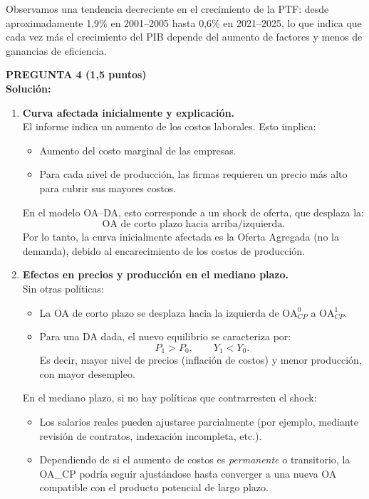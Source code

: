 \documentclass[11pt,addpoints]{article}
\begin{document}
Observamos una tendencia decreciente en el crecimiento de la PTF: desde aproximadamente 1,9\% en 2001–2005 hasta 0,6\% en 2021–2025, lo que indica que cada vez más el crecimiento del PIB depende del aumento de factores y menos de ganancias de eficiencia.

\vspace{0.5cm}
\textbf{PREGUNTA 4 (1,5 puntos)}\\
\textbf{Solución:}\\
\begin{enumerate}[label=\alph*)]
  \item \textbf{Curva afectada inicialmente y explicación.}\\[0.1cm]
  El informe indica un aumento de los costos laborales. Esto implica:
  \begin{itemize}
    \item Aumento del costo marginal de las empresas.
    \item Para cada nivel de producción, las firmas requieren un precio más alto para cubrir sus mayores costos.
  \end{itemize}

  En el modelo OA–DA, esto corresponde a un shock de oferta, que desplaza la:
  \[
  \text{OA de corto plazo hacia arriba/izquierda}.
  \]
  Por lo tanto, la curva inicialmente afectada es la Oferta Agregada (no la demanda), debido al encarecimiento de los costos de producción.

\newpage
\vspace*{0.5cm}

  \item \textbf{Efectos en precios y producción en el mediano plazo.}\\[0.1cm]
  Sin otras políticas:
  \begin{itemize}
    \item La OA de corto plazo se desplaza hacia la izquierda de $\text{OA}_{CP}^0$ a $\text{OA}_{CP}^1$.
    \item Para una DA dada, el nuevo equilibrio se caracteriza por:
    \[
      P_1 > P_0, \qquad Y_1 < Y_0.
    \]
    Es decir, mayor nivel de precios (inflación de costos) y menor producción, con mayor desempleo.
  \end{itemize}

  En el mediano plazo, si no hay políticas que contrarresten el shock:
  \begin{itemize}
    \item Los salarios reales pueden ajustarse parcialmente (por ejemplo, mediante revisión de contratos, indexación incompleta, etc.).
    \item Dependiendo de si el aumento de costos es \emph{permanente} o transitorio, la OA\_CP podría seguir ajustándose hasta converger a una nueva OA compatible con el producto potencial de largo plazo.
  \end{itemize}


\end{enumerate}
\end{document}
